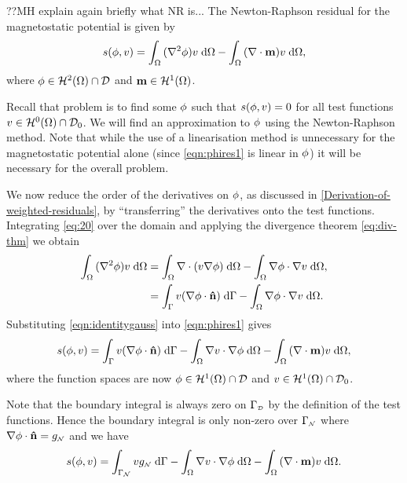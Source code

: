 {??MH explain again briefly what NR is...
The Newton-Raphson residual for the magnetostatic potential is given by
\begin{gather}
  s(\phi, v) = {\int_{\Omega} { (\nabla^2 \phi) v } {\; \mathrm{{d}}} {\Omega}}
  - {\int_{\Omega} { (\nabla \cdot \boldsymbol{\mathrm{m}}) v} {\; \mathrm{{d}}} {\Omega}}, \label{eqn:phires1}
\end{gather}
where $\phi \in \mathcal{H}^2(\Omega) \cap \mathcal{D}$ and $\boldsymbol{\mathrm{m}} \in \mathcal{H}^1(\Omega)$.

Recall that problem is to find some $\phi$ such that $s(\phi, v) = 0$ for all test functions $v \in \mathcal{H}^0(\Omega) \cap \mathcal{D}_0$.
We will find an approximation to $\phi$ using the Newton-Raphson method.
Note that while the use of a linearisation method is unnecessary for the magnetostatic potential alone (since \cref{eqn:phires1} is linear in $\phi$) it will be necessary for the overall problem.

We now reduce the order of the derivatives on $\phi$, as discussed in \cref{Derivation-of-weighted-residuals}, by ``transferring'' the derivatives onto the test functions.
Integrating \cref{eq:20} over the domain and applying the divergence theorem \cref{eq:div-thm} we obtain
\begin{equation}
  \begin{aligned}
    {\int_{\Omega} { (\nabla^2\phi) v} {\; \mathrm{{d}}}{\Omega}} &=  {\int_{\Omega} {\nabla \cdot (v \nabla \phi)} {\; \mathrm{{d}}} {\Omega}}
           - {\int_{\Omega} {\nabla \phi \cdot \nabla v} {\; \mathrm{{d}}} {\Omega}},\\
    &= {\int_{{\Gamma}} {v (\nabla \phi \cdot \boldsymbol{\mathrm{\hat{n}}})} {\; \mathrm{{d}}} {{\Gamma}}}
    - {\int_{\Omega} { \nabla \phi \cdot \nabla v} {\; \mathrm{{d}}} {\Omega}}.
    \label{eqn:identitygauss}
  \end{aligned}
\end{equation}
Substituting \cref{eqn:identitygauss} into \cref{eqn:phires1} gives
\begin{equation}
  s(\phi, v) = {\int_{{\Gamma}} { v (\nabla \phi \cdot \boldsymbol{\mathrm{\hat{n}}}) } {\; \mathrm{{d}}} {{\Gamma}}}
  - {\int_{\Omega} { \nabla v \cdot \nabla \phi } {\; \mathrm{{d}}} {\Omega}}
  - {\int_{\Omega} { (\nabla \cdot \boldsymbol{\mathrm{m}}) v } {\; \mathrm{{d}}} {\Omega}},
\end{equation}
where the function spaces are now $\phi \in \mathcal{H}^1(\Omega) \cap \mathcal{D}$ and $v \in \mathcal{H}^1(\Omega) \cap \mathcal{D}_0$.

Note that the boundary integral is always zero on ${\Gamma}_{\scriptscriptstyle{\mathcal{D}}}$ by the definition of the test functions.
Hence the boundary integral is only non-zero over ${\Gamma}_{{\scriptscriptstyle{\mathcal{N}}}}$ where $\nabla \phi \cdot \boldsymbol{\mathrm{\hat{n}}} = g_{{\scriptscriptstyle{\mathcal{N}}}}$ and we have
\begin{equation}
  s(\phi, v) = \int_{{\Gamma}_{\scriptscriptstyle{\mathcal{N}}}} v g_{\scriptscriptstyle{\mathcal{N}}} {\; \mathrm{{d}}} {\Gamma}
  - {\int_{\Omega} { \nabla v \cdot \nabla \phi} {\; \mathrm{{d}}} {\Omega}}
  - {\int_{\Omega} { (\nabla \cdot \boldsymbol{\mathrm{m}}) v} {\; \mathrm{{d}}} {\Omega}}.
  \label{res:contphi}
\end{equation}

}
